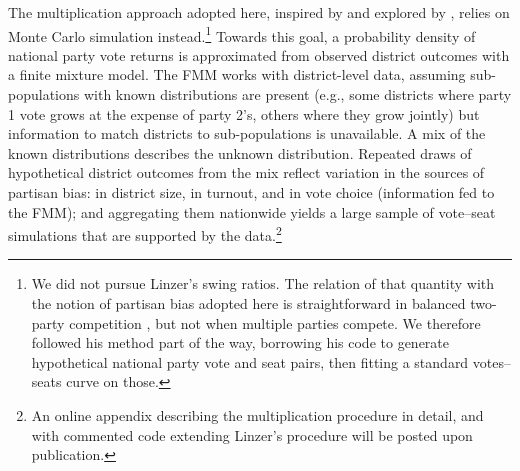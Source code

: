\documentclass[letter,12pt]{article}
\begin{document}
The multiplication approach adopted here, inspired by \citet{linzerSeatVoteElasticity2012} and explored by \citet{marquez2014mixSwingBlog}, relies on Monte Carlo simulation instead.\footnote{We did not pursue Linzer's swing ratios. The relation of that quantity with the notion of partisan bias adopted here is straightforward in balanced two-party competition \citep[see][:410]{linzerSeatVoteElasticity2012}, but not when multiple parties compete. We therefore followed his method part of the way, borrowing his code to generate hypothetical national party vote and seat pairs, then fitting a standard votes--seats curve on those.} Towards this goal, a probability density of national party vote returns is approximated from observed district outcomes with a finite mixture model. The FMM works with district-level data, assuming sub-populations with known distributions are present (e.g., some districts where party 1 vote grows at the expense of party 2's, others where they grow jointly) but information to match districts to sub-populations is unavailable. A mix of the known distributions describes the unknown distribution. Repeated draws of hypothetical district outcomes from the mix reflect variation in the sources of partisan bias: in district size, in turnout, and in vote choice (information fed to the FMM); and aggregating them nationwide yields a large sample of vote--seat simulations that are supported by the data.\footnote{An online appendix describing the multiplication procedure in detail, and with commented code extending Linzer's procedure will be posted upon publication.} 
\end{document}
